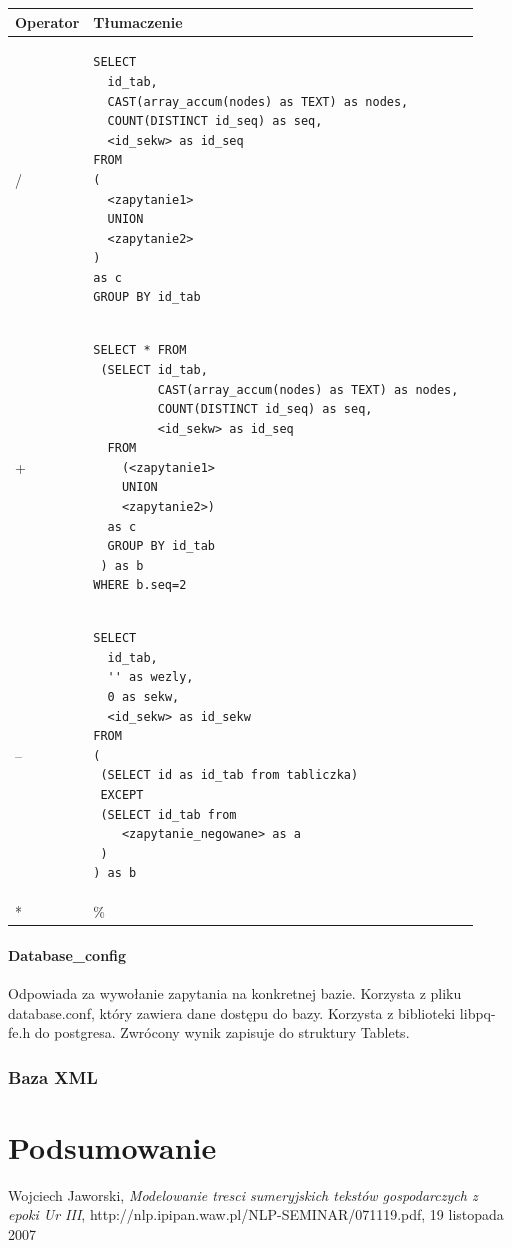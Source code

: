 \documentclass{pracamgr}
\begin{document}
\begin{longtable}{|p{1in}|p{4.5in}|}
\hline
{\bf Operator} & {\bf Tłumaczenie}\\
\hline
\endhead
/ & 
\begin{verbatim}
SELECT 
  id_tab, 
  CAST(array_accum(nodes) as TEXT) as nodes, 
  COUNT(DISTINCT id_seq) as seq,
  <id_sekw> as id_seq
FROM 
(
  <zapytanie1>
  UNION
  <zapytanie2>
)
as c
GROUP BY id_tab
\end{verbatim}
\\ 
\hline
+ &
\begin{verbatim}
SELECT * FROM
 (SELECT id_tab, 
         CAST(array_accum(nodes) as TEXT) as nodes, 
         COUNT(DISTINCT id_seq) as seq, 
         <id_sekw> as id_seq
  FROM
    (<zapytanie1>
    UNION
    <zapytanie2>)
  as c 
  GROUP BY id_tab
 ) as b
WHERE b.seq=2 
\end{verbatim}
\\ 
\hline
-- & 
\begin{verbatim}
SELECT 
  id_tab, 
  '' as wezly, 
  0 as sekw,
  <id_sekw> as id_sekw
FROM
(
 (SELECT id as id_tab from tabliczka)
 EXCEPT
 (SELECT id_tab from
    <zapytanie_negowane> as a
 )   
) as b
\end{verbatim}
\\ 
\hline
* & \%  \\ 
\hline
\end{longtable}


\subsubsection{Database\_config}
Odpowiada za wywołanie zapytania na konkretnej bazie. Korzysta z pliku database.conf, który zawiera dane dostępu do bazy. 
Korzysta z biblioteki libpq-fe.h do postgresa. Zwrócony wynik zapisuje do struktury Tablets.

\subsection{Baza XML}


\chapter{Podsumowanie}


\appendix



\begin{thebibliography}{99}
 Wojciech Jaworski, \textit{Modelowanie tresci sumeryjskich tekstów gospodarczych z epoki Ur III}, 
http://nlp.ipipan.waw.pl/NLP-SEMINAR/071119.pdf, 19 listopada 2007


\end{thebibliography}

\listoffigures
\end{document}
